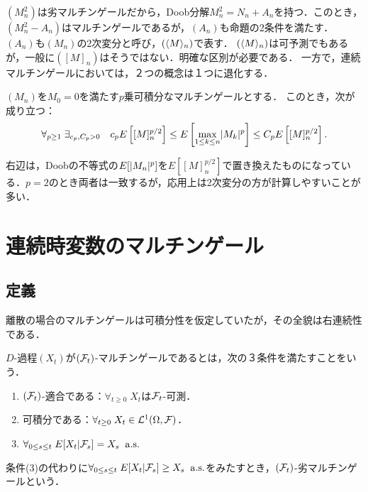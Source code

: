 \documentclass[uplatex,dvipdfmx]{jsreport}
\begin{document}
\begin{remark}
    $(M^2_n)$は劣マルチンゲールだから，Doob分解$M_n^2=N_n+A_n$を持つ．このとき，$(M_n^2-A_n)$はマルチンゲールであるが，$(A_n)$も命題の2条件を満たす．
    $(A_n)$も$(M_n)$の2次変分と呼び，$(\langle M\rangle_n)$で表す．
    $(\langle M\rangle_n)$は可予測でもあるが，一般に$([M]_n)$はそうではない．明確な区別が必要である．
    一方で，連続マルチンゲールにおいては，２つの概念は１つに退化する．
\end{remark}

\begin{theorem}
    $(M_n)$を$M_0=0$を満たす$p$乗可積分なマルチンゲールとする．
    このとき，次が成り立つ：
    \[\forall_{p\ge 1}\;\exists_{c_p,C_p>0}\quad c_pE\left[[M]^{p/2}_n\right]\le E\left[\max_{1\le k\le n}\lvert M_k\rvert^p\right]\le C_pE\left[[M]^{p/2}_n\right].\]
\end{theorem}
\begin{remarks}
    右辺は，Doobの不等式の$E[\lvert M_n\rvert^p]$を$E[[M]_n^{p/2}]$で置き換えたものになっている．$p=2$のとき両者は一致するが，応用上は2次変分の方が計算しやすいことが多い．
\end{remarks}

\section{連続時変数のマルチンゲール}

\subsection{定義}

\begin{tcolorbox}[colframe=ForestGreen, colback=ForestGreen!10!white,breakable,colbacktitle=ForestGreen!40!white,coltitle=black,fonttitle=\bfseries\sffamily,
title=]
    離散の場合のマルチンゲールは可積分性を仮定していたが，その全貌は右連続性である．
\end{tcolorbox}

\begin{definition}
    $D$-過程$(X_t)$が$(\mathcal{F}_t)$-マルチンゲールであるとは，次の３条件を満たすことをいう．
    \begin{enumerate}[({M}1)]
        \item $(\mathcal{F}_t)$-適合である：$\forall_{t\ge0}\;X_t$は$\mathcal{F}_t$-可測．
        \item 可積分である：$\forall_{t\ge0}\;X_t\in\mathcal{L}^1(\Omega,\mathcal{F})$．
        \item $\forall_{0\le s\le t}\;E[X_t|\mathcal{F}_s]=X_s\;\;\mathrm{a.s.}$
    \end{enumerate}
    条件(3)の代わりに$\forall_{0\le s\le t}\;E[X_t|\mathcal{F}_s]\ge X_s\;\;\mathrm{a.s.}$をみたすとき，$(\mathcal{F}_t)$-劣マルチンゲールという．
\end{definition}
\end{document}
